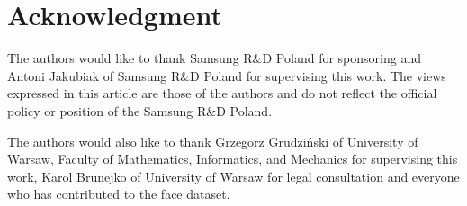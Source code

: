 \section*{Acknowledgment}
The authors would like to thank
Samsung R\&D Poland for sponsoring and Antoni Jakubiak of Samsung R\&D Poland
for supervising this work.
The views expressed in this article are those of the
authors and do not reflect the official policy or position of
the Samsung R\&D Poland.

\bigskip
The authors would also like to thank Grzegorz Grudziński of University of Warsaw,
Faculty of Mathematics, Informatics, and Mechanics for supervising this work,
Karol Brunejko of University of Warsaw for legal consultation and everyone who
has contributed to the face dataset.
